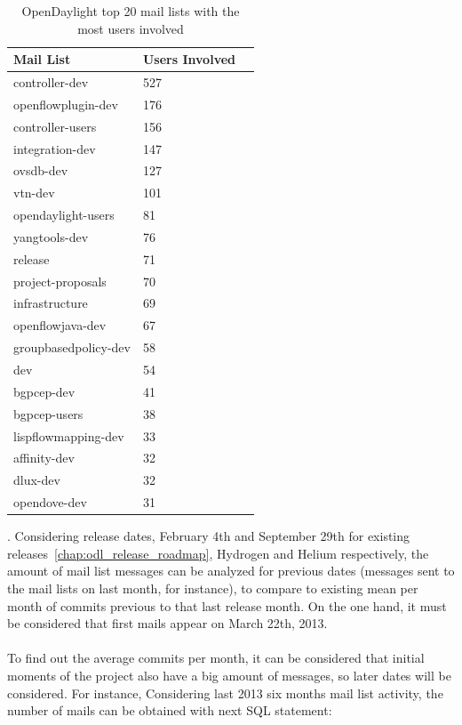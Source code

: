 \documentclass[a4paper, 12pt]{book}
\begin{document}
\begin{table}[H]
\footnotesize
\begin{center}
\begin{tabular}{|l|l|p{3cm}|}
\hline
\textbf{Mail List} & \textbf{Users Involved} \\ \hline
controller-dev & 527 \\ \hline
openflowplugin-dev & 176 \\ \hline
controller-users & 156 \\ \hline
integration-dev & 147 \\ \hline
ovsdb-dev & 127 \\ \hline
vtn-dev & 101 \\ \hline
opendaylight-users & 81 \\ \hline
yangtools-dev & 76 \\ \hline
release & 71 \\ \hline
project-proposals & 70 \\ \hline
infrastructure & 69 \\ \hline
openflowjava-dev & 67 \\ \hline
groupbasedpolicy-dev & 58 \\ \hline
dev & 54 \\ \hline
bgpcep-dev & 41 \\ \hline
bgpcep-users & 38 \\ \hline
lispflowmapping-dev & 33 \\ \hline
affinity-dev & 32 \\ \hline
dlux-dev & 32 \\ \hline
opendove-dev & 31 \\ \hline
\end{tabular}
\end{center}
\caption{OpenDaylight top 20 mail lists with the most users involved}
\label{tab:odl_top_maillists}
\end{table}

. Considering release dates, February 4th and September 29th for existing releases~\ref{chap:odl_release_roadmap}, Hydrogen and Helium respectively, the amount of mail list messages can be analyzed for previous dates (messages sent to the mail lists on last month, for instance), to compare to existing mean per month of commits previous to that last release month. On the one hand, it must be considered that first mails appear on March 22th, 2013.\\
\\
To find out the average commits per month, it can be considered that initial moments of the project also have a big amount of messages, so later dates will be considered. For instance, Considering last 2013 six months mail list activity, the number of mails can be obtained with next SQL statement:
\end{document}
